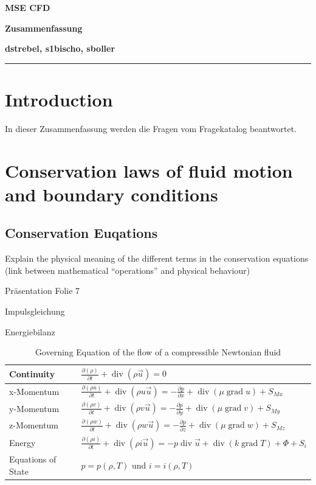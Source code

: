 \documentclass[a4paper]{scrartcl}
\begin{document}
\pagestyle{fancy}
\setlength{\footskip}{10mm}
\fancyhf{}
\renewcommand{\headrulewidth}{0pt}
\renewcommand{\footrulewidth}{0.5pt}

 \centerline{\LARGE \bf \textsf{MSE CFD}} 
 \smallskip
\centerline{\Large \bf \textsf {Zusammenfassung}}
\medskip
  \centerline{\bf \textsf{dstrebel, s1bischo, sboller }}

 \smallskip \noindent\rule{\textwidth}{0.5pt}
\smallskip%

\section{Introduction}
In dieser Zusammenfassung werden die Fragen vom Fragekatalog beantwortet.


\section{Conservation laws of fluid motion and boundary conditions}
\subsection{Conservation Euqations}
Explain the physical meaning of the different terms in the conservation
equations (link between mathematical “operations” and physical behaviour)

Präsentation Folie 7

Impulsgleichung


Energiebilanz

\begin{table}[h]
\begin{center}
\begin{tabular}{|l|l|}
\hline Continuity & $\frac{\partial(\rho)}{\partial t}+\operatorname{div}(\rho
\vec u)=0$
\\
\hline x-Momentum & $\frac{\partial(\rho u)}{\partial
t}+\operatorname{div}(\rho u \vec u) = - \frac{\partial p}{\partial
x}+\operatorname{div}(\mu \operatorname{grad} u)+S_{Mx}$ \\
\hline y-Momentum & $\frac{\partial(\rho v)}{\partial
t}+\operatorname{div}(\rho v \vec u) = - \frac{\partial p}{\partial
y}+\operatorname{div}(\mu \operatorname{grad} v)+S_{My}$ \\
\hline z-Momentum & $\frac{\partial(\rho w)}{\partial
t}+\operatorname{div}(\rho w \vec u) = - \frac{\partial p}{\partial
z}+\operatorname{div}(\mu \operatorname{grad} w)+S_{Mz}$ \\
\hline Energy & $\frac{\partial(\rho i)}{\partial
t}+\operatorname{div}(\rho i \vec u) = -p \operatorname{div} \vec u +
\operatorname{div}(k \operatorname{grad} T) + \Phi + S_i$ \\
\hline Equations of State & $p=p(\rho, T)$ und $i=i(\rho, T)$ \\
\hline
\end{tabular}
\caption{Governing Equation of the flow of a compressible Newtonian fluid}
\end{center}
\end{table}
\end{document}
